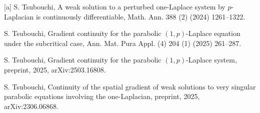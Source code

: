 \documentclass[reqno,10pt]{amsart}
\numberwithin{equation}{section}
\begin{document}
\begin{thebibliography}{[a]}
		 S. Tsubouchi, A weak solution to a perturbed one-Laplace system by $p$-Laplacian is continuously differentiable, Math. Ann. 388 (2) (2024) 1261--1322.
		
		 S. Tsubouchi, Gradient continuity for the parabolic $(1,p)$-Laplace equation under the subcritical case, Ann. Mat. Pura Appl. (4) 204 (1) (2025) 261--287.
		
		 S. Tsubouchi, Gradient continuity for the parabolic $(1,p)$-Laplace system, preprint, 2025, arXiv:2503.16808.
		
		 S. Tsubouchi, Continuity of the spatial gradient of weak solutions to very singular parabolic equations involving the one-Laplacian, preprint, 2025, arXiv:2306.06868.
	\end{thebibliography}
\end{document}
